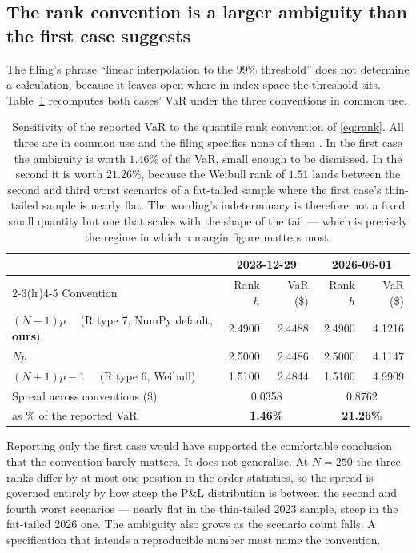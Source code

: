 \documentclass[11pt]{article}
\begin{document}
\subsection{The rank convention is a larger ambiguity than the first case suggests}
\label{sec:rank}

The filing's phrase ``linear interpolation to the $99\%$ threshold'' does not determine a
calculation, because it leaves open where in index space the threshold sits.
Table~\ref{tab:rank} recomputes both cases' VaR under the three conventions in common use.

\begin{table}[t]
\centering
\small
\caption{Sensitivity of the reported VaR to the quantile rank convention of
\eqref{eq:rank}. All three are in common use and the filing specifies none of them
\citep{hyndman1996}. In the first case the ambiguity is worth $1.46\%$ of the VaR, small
enough to be dismissed. In the second it is worth $21.26\%$, because the Weibull rank of
$1.51$ lands between the second and third worst scenarios of a fat-tailed sample where
the first case's thin-tailed sample is nearly flat. The wording's indeterminacy is
therefore not a fixed small quantity but one that scales with the shape of the tail ---
which is precisely the regime in which a margin figure matters most.}
\label{tab:rank}
\begin{tabular}{lrrrr}
\toprule
 & \multicolumn{2}{c}{2023-12-29} & \multicolumn{2}{c}{2026-06-01} \\
\cmidrule(lr){2-3}\cmidrule(lr){4-5}
Convention & Rank $h$ & VaR (\$) & Rank $h$ & VaR (\$) \\
\midrule
$(N-1)p$ \ \ (R type 7, NumPy default, \textbf{ours}) & 2.4900 & 2.4488 & 2.4900 & 4.1216 \\
$Np$                                                  & 2.5000 & 2.4486 & 2.5000 & 4.1147 \\
$(N+1)p-1$ \ \ (R type 6, Weibull)                    & 1.5100 & 2.4844 & 1.5100 & 4.9909 \\
\midrule
Spread across conventions (\$)                        & \multicolumn{2}{c}{0.0358} & \multicolumn{2}{c}{0.8762} \\
\quad as \% of the reported VaR                       & \multicolumn{2}{c}{\textbf{1.46\%}} & \multicolumn{2}{c}{\textbf{21.26\%}} \\
\bottomrule
\end{tabular}
\end{table}

Reporting only the first case would have supported the comfortable conclusion that the
convention barely matters. It does not generalise. At $N=250$ the three ranks differ by
at most one position in the order statistics, so the spread is governed entirely by how
steep the P\&L distribution is between the second and fourth worst scenarios --- nearly
flat in the thin-tailed 2023 sample, steep in the fat-tailed 2026 one. The ambiguity also
grows as the scenario count falls. A specification that intends a reproducible number
must name the convention.
\end{document}
